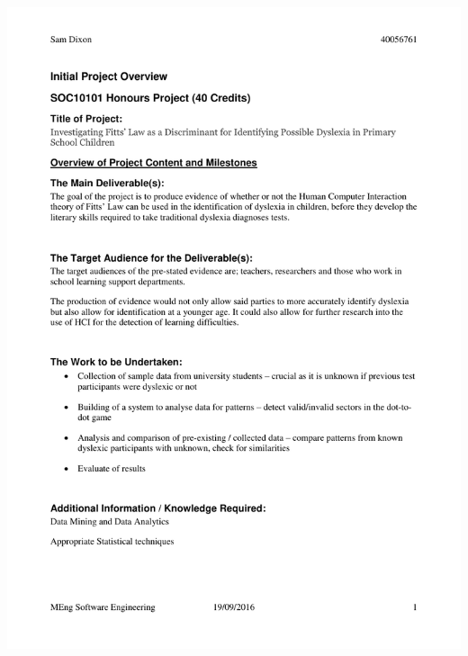 \begin{appendices}
		\includegraphics[page=2, width={\textwidth}]{../images/ipo}
		\newpage
		

\end{appendices}
